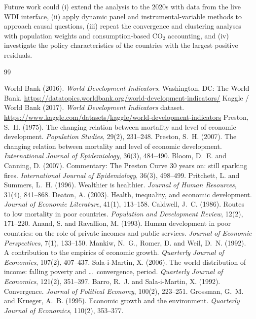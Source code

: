 \documentclass[11pt,a4paper]{article}
\begin{document}
Future work could (i) extend the analysis to the 2020s with data from the live WDI interface, (ii) apply dynamic panel and instrumental-variable methods to approach causal questions, (iii) repeat the convergence and clustering analyses with population weights and consumption-based CO$_2$ accounting, and (iv) investigate the policy characteristics of the countries with the largest positive residuals.

\begin{thebibliography}{99}
 World Bank (2016). \emph{World Development Indicators}. Washington, DC: The World Bank. \url{https://datatopics.worldbank.org/world-development-indicators/}
 Kaggle / World Bank (2017). \emph{World Development Indicators} dataset. \url{https://www.kaggle.com/datasets/kaggle/world-development-indicators}
 Preston, S.~H. (1975). The changing relation between mortality and level of economic development. \emph{Population Studies}, 29(2), 231--248.
 Preston, S.~H. (2007). The changing relation between mortality and level of economic development. \emph{International Journal of Epidemiology}, 36(3), 484--490.
 Bloom, D.~E. and Canning, D. (2007). Commentary: The Preston Curve 30 years on: still sparking fires. \emph{International Journal of Epidemiology}, 36(3), 498--499.
 Pritchett, L. and Summers, L.~H. (1996). Wealthier is healthier. \emph{Journal of Human Resources}, 31(4), 841--868.
 Deaton, A. (2003). Health, inequality, and economic development. \emph{Journal of Economic Literature}, 41(1), 113--158.
 Caldwell, J.~C. (1986). Routes to low mortality in poor countries. \emph{Population and Development Review}, 12(2), 171--220.
 Anand, S. and Ravallion, M. (1993). Human development in poor countries: on the role of private incomes and public services. \emph{Journal of Economic Perspectives}, 7(1), 133--150.
 Mankiw, N.~G., Romer, D. and Weil, D.~N. (1992). A contribution to the empirics of economic growth. \emph{Quarterly Journal of Economics}, 107(2), 407--437.
 Sala-i-Martin, X. (2006). The world distribution of income: falling poverty and \ldots\ convergence, period. \emph{Quarterly Journal of Economics}, 121(2), 351--397.
 Barro, R.~J. and Sala-i-Martin, X. (1992). Convergence. \emph{Journal of Political Economy}, 100(2), 223--251.
 Grossman, G.~M. and Krueger, A.~B. (1995). Economic growth and the environment. \emph{Quarterly Journal of Economics}, 110(2), 353--377.

\end{thebibliography}
\end{document}
